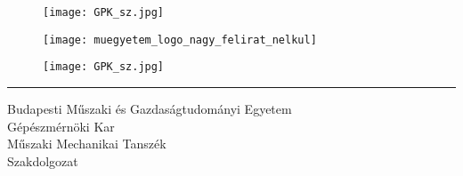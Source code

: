 \begin{titlepage}
	\begin{figure}[h]
		\centering
		\begin{minipage}[h]{0.15\textwidth}
			\centering
			\texttt{[image: GPK\_sz.jpg]}
		\end{minipage}
		\quad %
		\begin{minipage}[h]{0.6\textwidth}
			\centering
			\texttt{[image: muegyetem\_logo\_nagy\_felirat\_nelkul]}
		\end{minipage}
		\quad %
		\begin{minipage}[h]{0.15\textwidth}
			\centering
			\texttt{[image: GPK\_sz.jpg]}
		\end{minipage}
	\end{figure}
	\hrule
	\vspace{1em}
	{\large Budapesti Műszaki és Gazdaságtudományi Egyetem}\\[0.2em]%
	{\large Gépészmérnöki Kar}\\[0.2em] %
	{\large Műszaki Mechanikai Tanszék}\\[0.2em] %
	{\large Szakdolgozat}  %
	
	\vspace{15em}
	

\end{titlepage}
